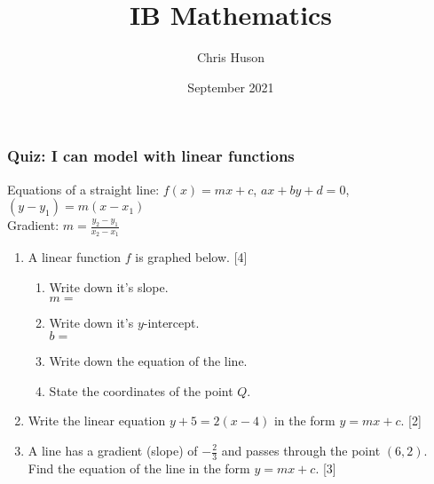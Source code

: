 \documentclass[12pt, twoside]{article}
\title{IB Mathematics}
\author{Chris Huson}
\date{September 2021}
\begin{document}
\subsubsection*{Quiz: I can model with linear functions}
Equations of a straight line: $f(x)=mx+c$, $ax+by+d=0$, $(y-y_1)=m(x-x_1)$\\[0.25cm]
Gradient: $\displaystyle m=\frac{y_2-y_1}{x_2-x_1}$ \vspace{1cm}
\begin{enumerate}
\item A linear function $f$ is graphed below. \hfill [4]
\begin{multicols}{2}
\begin{enumerate}
  \item Write down it's slope.\\ $m=$
  \vspace{0.25cm}
  \item Write down it's $y$-intercept.\\ $b=$
  \vspace{0.25cm}
  \item Write down the equation of the line.
  \vspace{1cm}
  \item State the coordinates of the point $Q$.
\end{enumerate} \vspace{.5cm}
  \begin{center} 
  \end{center}
\end{multicols}

\item Write the linear equation $y+5=2(x-4)$ in the form $y=mx+c$.  \hfill [2]\vspace{4cm}

\item A line has a gradient (slope) of $\displaystyle -\frac{2}{3}$ and passes through the point $(6, 2)$. Find the equation of the line in the form $y=mx+c$. \hfill [3]


\end{enumerate}
\end{document}
